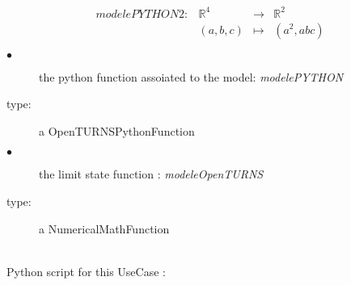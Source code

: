 \begin{equation}
  \begin{array}{l|lcl}
    modelePYTHON2 : & \mathbb{R}^4 & \rightarrow & \mathbb{R}^2 \\
    & (a,b,c)    & \mapsto     & \displaystyle (a^2, abc)
  \end{array}
\end{equation}


{
  \begin{description}
  \item[$\bullet$] the python function assoiated to the model: {\itshape modelePYTHON}
  \item[type:] a OpenTURNSPythonFunction
  \item[$\bullet$] the limit state function : {\itshape modeleOpenTURNS}
  \item[type:] a NumericalMathFunction
  \end{description}
}

\textspace\\
Python script for this UseCase :

